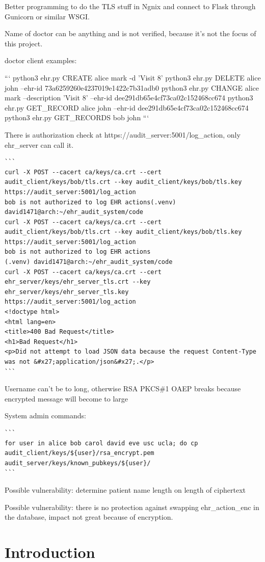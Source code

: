 \documentclass[11pt]{article}
\begin{document}
\begin{flushleft}
Better programming to do the TLS stuff in Ngnix and connect to Flask through Gunicorn or similar WSGI.

Name of doctor can be anything and is not verified, because it's not the focus of this project.

doctor client examples:

```
python3 ehr.py CREATE alice mark -d 'Visit 8'
python3 ehr.py DELETE alice john --ehr-id 73a6259260e4237019e1422c7b31adb0
python3 ehr.py CHANGE alice mark --description 'Visit 8' --ehr-id dee291db65e4cf73ca02c152468cc674
python3 ehr.py GET_RECORD alice john --ehr-id dee291db65e4cf73ca02c152468cc674
python3 ehr.py GET_RECORDS bob john
```

There is authorization check at https://audit_server:5001/log_action, only ehr_server can call it.
\begin{lstlisting}
```
curl -X POST --cacert ca/keys/ca.crt --cert audit_client/keys/bob/tls.crt --key audit_client/keys/bob/tls.key https://audit_server:5001/log_action
bob is not authorized to log EHR actions(.venv) david1471@arch:~/ehr_audit_system/code
curl -X POST --cacert ca/keys/ca.crt --cert audit_client/keys/bob/tls.crt --key audit_client/keys/bob/tls.key https://audit_server:5001/log_action
bob is not authorized to log EHR actions
(.venv) david1471@arch:~/ehr_audit_system/code
curl -X POST --cacert ca/keys/ca.crt --cert ehr_server/keys/ehr_server_tls.crt --key ehr_server/keys/ehr_server_tls.key https://audit_server:5001/log_action
<!doctype html>
<html lang=en>
<title>400 Bad Request</title>
<h1>Bad Request</h1>
<p>Did not attempt to load JSON data because the request Content-Type was not &#x27;application/json&#x27;.</p>
```
\end{lstlisting}

Username can't be to long, otherwise RSA PKCS\#1 OAEP breaks because encrypted message will become to large

System admin commands:
\begin{lstlisting}
```
for user in alice bob carol david eve usc ucla; do cp audit_client/keys/${user}/rsa_encrypt.pem audit_server/keys/known_pubkeys/${user}/
```
\end{lstlisting}

Possible vulnerability: determine patient name length on length of ciphertext

Possible vulnerability: there is no protection against swapping ehr_action_enc in the database, impact not great because of encryption.

\section{Introduction}


\end{flushleft}
\end{document}

